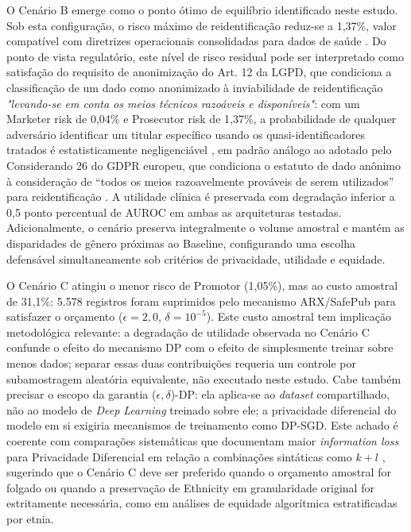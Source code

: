 O Cenário B emerge como o ponto ótimo de equilíbrio identificado neste estudo. Sob esta configuração, o risco máximo de reidentificação reduz-se a 1,37\%, valor compatível com diretrizes operacionais consolidadas para dados de saúde \cite{ElEmam2013}. Do ponto de vista regulatório, este nível de risco residual pode ser interpretado como satisfação do requisito de anonimização do Art. 12 da LGPD, que condiciona a classificação de um dado como anonimizado à inviabilidade de reidentificação \textit{"levando-se em conta os meios técnicos razoáveis e disponíveis"}: com um Marketer risk de 0,04\% e Prosecutor risk de 1,37\%, a probabilidade de qualquer adversário identificar um titular específico usando os quasi-identificadores tratados é estatisticamente negligenciável \cite{ANPD2023juridica}, em padrão análogo ao adotado pelo Considerando 26 do GDPR europeu, que condiciona o estatuto de dado anônimo à consideração de ``todos os meios razoavelmente prováveis de serem utilizados'' para reidentificação \cite{GDPR2016}. A utilidade clínica é preservada com degradação inferior a 0,5 ponto percentual de AUROC em ambas as arquiteturas testadas. Adicionalmente, o cenário preserva integralmente o volume amostral e mantém as disparidades de gênero próximas ao Baseline, configurando uma escolha defensável simultaneamente sob critérios de privacidade, utilidade e equidade.

O Cenário C atingiu o menor risco de Promotor (1,05\%), mas ao custo amostral de 31,1\%: 5.578 registros foram suprimidos pelo mecanismo ARX/SafePub para satisfazer o orçamento ($\epsilon=2{,}0$, $\delta=10^{-5}$). Este custo amostral tem implicação metodológica relevante: a degradação de utilidade observada no Cenário C confunde o efeito do mecanismo DP com o efeito de simplesmente treinar sobre menos dados; separar essas duas contribuições requeria um controle por subamostragem aleatória equivalente, não executado neste estudo. Cabe também precisar o escopo da garantia ($\epsilon, \delta$)-DP: ela aplica-se ao \textit{dataset} compartilhado, não ao modelo de \textit{Deep Learning} treinado sobre ele; a privacidade diferencial do modelo em si exigiria mecanismos de treinamento como DP-SGD. Este achado é coerente com comparações sistemáticas que documentam maior \textit{information loss} para Privacidade Diferencial em relação a combinações sintáticas como $k+l$ \cite{Fakeeroodeen2021, Pilgram2024}, sugerindo que o Cenário C deve ser preferido quando o orçamento amostral for folgado ou quando a preservação de Ethnicity em granularidade original for estritamente necessária, como em análises de equidade algorítmica estratificadas por etnia.

